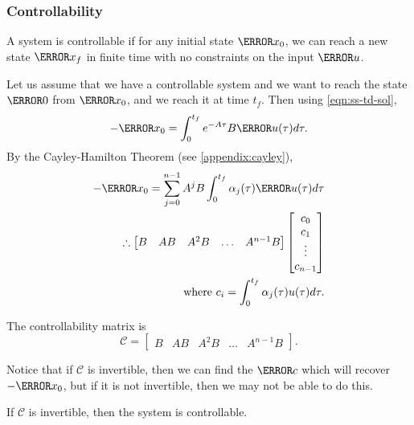\subsubsection{Controllability}
\begin{definition}
  A system is controllable if for any initial state $\V{x}_0$, we can reach a new state $\V{x}_f$ in finite time with no constraints on the input $\V{u}$.
  \label{defn:controllability}
\end{definition}
Let us assume that we have a controllable system and we want to reach the state $\V{0}$ from $\V{x}_0$, and we reach it at time $t_f$.
Then using \cref{eqn:ss-td-sol},
\[
  -\V{x}_0 = \int_0^{t_f} e^{-A\tau}B\V{u}(\tau)d\tau.
\]
By the Cayley-Hamilton Theorem (see \cref{appendix:cayley}),
\begin{align*}
  -\V{x}_0 = \sum_{j=0}^{n-1}A^jB\int_0^{t_f}\alpha_j(\tau)\V{u}(\tau)d\tau\\
  \therefore \begin{bmatrix} B & AB & A^2 B & \ldots & A^{n-1}B \end{bmatrix}
  \begin{bmatrix} c_0 \\ c_1 \\ \vdots \\ c_{n-1} \end{bmatrix}\\
  \text{where } c_i = \int_0^{t_f} \alpha_j(\tau)u(\tau)d\tau.
\end{align*}
\begin{definition}
  The controllability matrix is
  \[
	\mathcal{C} = \begin{bmatrix} B & AB & A^2 B & \ldots & A^{n-1}B \end{bmatrix}.
  \]
  \label{defn:controllability-matrix}
\end{definition}
Notice that if $\mathcal{C}$ is invertible, then we can find the $\V{c}$ which will recover $-\V{x}_0$, but if it is not invertible, then we may not be able to do this.
\begin{theorem}
  If $\mathcal{C}$ is invertible, then the system is controllable.
  \label{thm:controllability}
\end{theorem}
